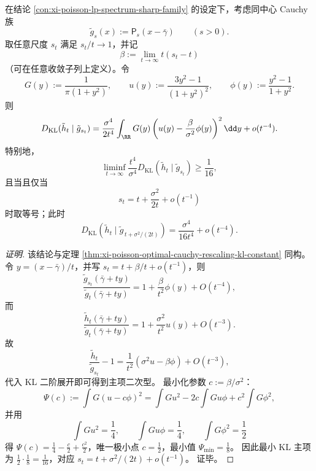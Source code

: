 \begin{conclusion}\label{con:xi-poisson-cauchy-information-projection-optimal-scale}
在结论 \ref{con:xi-poisson-lp-spectrum-sharp-family} 的设定下，考虑同中心 Cauchy 族
\[
\tilde g_s(x):=\mathsf P_s(x-\bar\gamma)\qquad(s>0).
\]
取任意尺度 \(s_t\) 满足 \(s_t/t\to1\)，并记
\[
\beta:=\lim_{t\to\infty}t(s_t-t)
\]
（可在任意收敛子列上定义）。令
\[
G(y):=\frac{1}{\pi(1+y^2)},\qquad
u(y):=\frac{3y^2-1}{(1+y^2)^2},\qquad
\phi(y):=\frac{y^2-1}{1+y^2}.
\]
则
\[
D_{\mathrm{KL}}(\tilde h_t\mid \tilde g_{s_t})
=\frac{\sigma^4}{2t^4}
\int_{\RR}G(y)\left(u(y)-\frac{\beta}{\sigma^2}\phi(y)\right)^2\dd y
+o(t^{-4}).
\]
特别地，
\[
\liminf_{t\to\infty}\frac{t^4}{\sigma^4}D_{\mathrm{KL}}(\tilde h_t\mid \tilde g_{s_t})\ge \frac{1}{16},
\]
且当且仅当
\[
s_t=t+\frac{\sigma^2}{2t}+o(t^{-1})
\]
时取等号；此时
\[
D_{\mathrm{KL}}\!\left(\tilde h_t\mid \tilde g_{\,t+\sigma^2/(2t)}\right)
=\frac{\sigma^4}{16t^4}+o(t^{-4}).
\]
\end{conclusion}
\begin{proof}[证明]
该结论与定理 \ref{thm:xi-poisson-optimal-cauchy-rescaling-kl-constant} 同构。
令 \(y=(x-\bar\gamma)/t\)，并写 \(s_t=t+\beta/t+o(t^{-1})\)，则
\[
\frac{\tilde g_{s_t}(\bar\gamma+ty)}{\tilde g_t(\bar\gamma+ty)}
=1+\frac{\beta}{t^2}\phi(y)+O(t^{-4}),
\]
而
\[
\frac{\tilde h_t(\bar\gamma+ty)}{\tilde g_t(\bar\gamma+ty)}
=1+\frac{\sigma^2}{t^2}u(y)+O(t^{-3}).
\]
故
\[
\frac{\tilde h_t}{\tilde g_{s_t}}-1
=\frac{1}{t^2}\left(\sigma^2u-\beta\phi\right)+O(t^{-3}),
\]
代入 KL 二阶展开即可得到主项二次型。
最小化参数 \(c:=\beta/\sigma^2\)：
\[
\Psi(c):=\int G(u-c\phi)^2
=\int Gu^2-2c\int Gu\phi+c^2\int G\phi^2,
\]
并用
\[
\int Gu^2=\frac14,\qquad
\int Gu\phi=\frac14,\qquad
\int G\phi^2=\frac12
\]
得 \(\Psi(c)=\frac14-\frac{c}{2}+\frac{c^2}{2}\)，唯一极小点 \(c=\frac12\)，最小值 \(\Psi_{\min}=\frac18\)。
因此最小 KL 主项为 \(\frac12\cdot\frac18=\frac1{16}\)，对应
\(
s_t=t+\sigma^2/(2t)+o(t^{-1})
\)。
证毕。
\end{proof}

